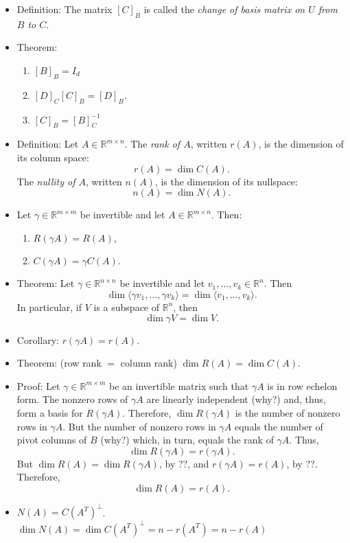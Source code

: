 \documentclass{amsart}
\newcommand{\RR}{\mathbb{R}}
\begin{document}
\begin{itemize}
  \item Definition: The matrix $[C]_B$ is called the \emph{change of basis matrix on $U$ from $B$ to $C$}.

  \item Theorem: \hfill
  \begin{enumerate}
    \item $[B]_B=I_d$
    \item $[D]_C[C]_B=[D]_B$.
    \item $[C]_B = [B]_C^{-1}$
  \end{enumerate}

  \item Definition: Let $A\in\RR^{m\times n}$. The \emph{rank of $A$}, written $r(A)$, is the dimension of its column space:
  \[
  r(A) = \dim C(A).  
  \]
  The \emph{nullity of $A$}, written $n(A)$, is the dimension of its nullspace:
  \[
  n(A) = \dim N(A).
  \]

  \item Let $\gamma\in\RR^{m\times m}$ be invertible and let $A\in\RR^{m\times n}$.
  Then:
  \begin{enumerate}
    \item $R(\gamma A)=R(A)$,
    \item $C(\gamma A)=\gamma C(A).$
  \end{enumerate}

  \item Theorem: Let $\gamma\in\RR^{n\times n}$ be invertible and let $v_1,\ldots,v_k\in \RR^n$.
  Then
  $$
  \dim \langle \gamma v_1,\ldots,\gamma v_k\rangle = \dim \langle v_1,\ldots,v_k\rangle.
  $$
  In particular, if $V$ is a subspace of $\RR^n$, then
  \[\dim \gamma V = \dim V.\]

  \item Corollary: $r(\gamma A) = r(A)$.

  \item Theorem: (row rank $=$ column rank) $\dim R(A) = \dim C(A)$.

  \item Proof: Let $\gamma\in\RR^{m\times m}$ be an invertible matrix such that $\gamma A$ is in row echelon form.
    The nonzero rows of $\gamma A$ are linearly independent (why?) and, thus, form a basis for $R(\gamma A)$.
    Therefore, $\dim R(\gamma A)$ is the number of nonzero rows in $\gamma A$.
    But the number of nonzero rows in $\gamma A$ equals the number of pivot columns of $B$ (why?) which, in turn, equals the rank of $\gamma A$.
    Thus,
    \[
      \dim R(\gamma A) = r(\gamma A).
    \]
    But $\dim R(A)=\dim R(\gamma A)$, by ??, and $r(\gamma A) = r(A)$, by ??. Therefore,
    \[\dim R(A)=r(A).\]


  \item $N(A) = C(A^T)^\perp$. $\dim N(A) = \dim C(A^T)^\perp = n-r(A^T) = n-r(A)$
\end{itemize}
\end{document}
